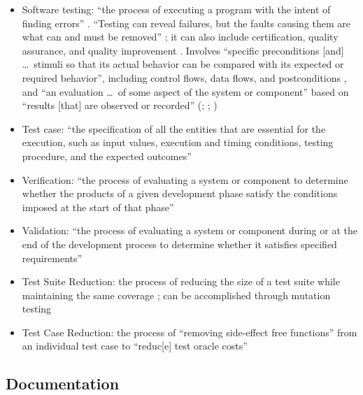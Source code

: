 \begin{itemize}
    \item Software testing: ``the process of executing a program with the
          intent of finding errors'' \citep[p.~438]{PetersAndPedrycz2000}
          . ``Testing can reveal
          failures, but the faults causing them are what can and must be
          removed'' \citep[p.~5-3]{SWEBOK2024}; it can also include
          certification, quality assurance, and quality improvement
          \citep[p.~5-4]{SWEBOK2024}. Involves ``specific preconditions
              [and] \dots\ stimuli so that its actual behavior can be
          compared with its expected or required behavior'', including
          control flows, data flows, and postconditions
          \citep[p.~11]{Firesmith2015}, and ``an evaluation \dots\ of some
          aspect of the system or component'' based on ``results [that]
          are observed or recorded'' (\citealp[p.~10]{IEEE2022};
          \citeyear[p.~6]{IEEE2021}; \citeyear[p.~465]{IEEE2017}
          )
    \item Test case: ``the specification of all the entities
          that are essential for the execution, such as input values,
          execution and timing conditions, testing procedure, and the
          expected outcomes'' \citep[pp.~5-1 to 5-2]{SWEBOK2024}
    \item Verification: ``the process of evaluating a system or component
          to determine whether the products of a given development phase
          satisfy the conditions imposed at the start of that phase''
          \citep[p.~400]{vanVliet2000}
    \item Validation: ``the process of evaluating a system or component
          during or at the end of the development process to determine
          whether it satisfies specified requirements''
          \citep[p.~400]{vanVliet2000}
    \item Test Suite Reduction: the process of reducing the size of a test
          suite while maintaining the same coverage
          \citep[p.~519]{BarrEtAl2015}; can be accomplished through
          mutation testing
    \item Test Case Reduction: the process of ``removing side-effect free
          functions'' from an individual test case to ``reduc[e] test oracle
          costs'' \citep[p.~519]{BarrEtAl2015}
\end{itemize}

\subsection{Documentation}

